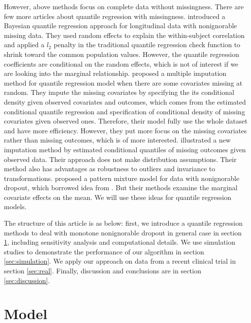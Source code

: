 \documentclass[12pt]{article}
\begin{document}
However, above methods focus on complete data without missingness.
There are few more articles about quantile regression with
missingness.  \citep{yuan2010} introduced a Bayesian quantile
regression approach for longitudinal data with nonignorable missing
data. They used random effects to explain the within-subject
correlation and applied a $l_2$ penalty in the traditional quantile
regression check function to shrink toward the common population
values. However, the quantile regression coefficients are conditional
on the random effects, which is not of interest if we are looking into
the marginal relationship.  \citep{wei2012} proposed a multiple
imputation method for quantile regression model when there are some
covariates missing at random. They impute the missing covariates by
specifying the its conditional density given observed covariates and
outcomes, which comes from the estimated conditional quantile
regression and specification of conditional density of missing
covariates given observed ones.  Therefore, their model fully use the
whole dataset and have more efficiency. However, they put more focus
on the missing covariates rather than missing outcomes, which is of
more interested.  \cite{bottai2013} illustrated a new imputation
method by estimated conditional quantiles of missing outcomes given
observed data. Their approach does not make distribution
assumptions. Their method also has advantages as robustness to
outliers and invariance to transformations.  \citep{roy2008} proposed
a pattern mixture model for data with nonignorable dropout, which
borrowed idea from \citep{heagerty1999}.  But their methods examine
the marginal covariate effects on the mean. We will use these ideas
for quantile regression models.



The structure of this article is as below: first, we introduce a
quantile regression methods to deal with monotone nonignorable dropout
in general case in section \ref{sec:model}, including sensitivity
analysis and computational details.  We use simulation studies to
demonstrate the performance of our algorithm in section
\ref{sec:simulation}. We apply our approach on data from a recent
clinical trial in section \ref{sec:real}. Finally, discussion and
conclusions are in section \ref{sec:discussion}.

\section{Model}
\label{sec:model}
\end{document}
